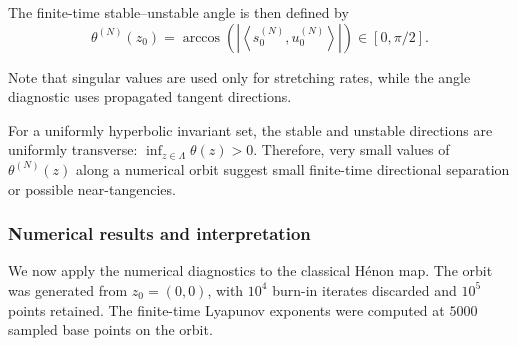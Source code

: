 \begin{enumerate}
    The finite-time stable--unstable angle is then defined by
    \[
    \theta^{(N)}(z_0)
    =
    \arccos
    \left(
    \left|
    \left\langle s_0^{(N)},u_0^{(N)}\right\rangle
    \right|
    \right)
    \in[0,\pi/2].
    \]

    Note that singular values are used only for stretching rates, while the angle diagnostic uses propagated tangent directions.

    For a uniformly hyperbolic invariant set, the stable and unstable directions are uniformly transverse:
    \( \inf_{z\in\Lambda}\theta(z)>0. \)
    Therefore, very small values of
    \( \theta^{(N)}(z) \)
    along a numerical orbit suggest small finite-time directional separation or possible near-tangencies.

    

\end{enumerate}
    
    
    
    







\subsubsection{Numerical results and interpretation}

We now apply the numerical diagnostics to the classical Hénon map. The orbit was generated from \(z_0=(0,0)\), with \(10^4\) burn-in iterates
discarded and \(10^5\) points retained. The finite-time Lyapunov exponents were
computed at \(5000\) sampled base points on the orbit. 


